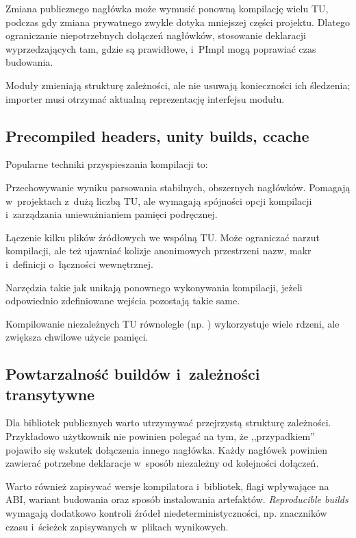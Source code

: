 Zmiana publicznego nagłówka może wymusić ponowną kompilację wielu TU,
podczas gdy zmiana prywatnego  zwykle dotyka mniejszej
części projektu. Dlatego ograniczanie niepotrzebnych dołączeń
nagłówków, stosowanie deklaracji wyprzedzających tam, gdzie są
prawidłowe, i~PImpl mogą poprawiać czas budowania.

Moduły zmieniają strukturę zależności, ale nie usuwają konieczności
ich śledzenia; importer musi otrzymać aktualną reprezentację
interfejsu modułu.

\subsection{Precompiled headers, unity builds, ccache}

Popularne techniki przyspieszania kompilacji to:
\begin{description}[style=nextline]
\item[Precompiled headers (PCH)]
Przechowywanie wyniku parsowania stabilnych, obszernych nagłówków.
Pomagają w~projektach z~dużą liczbą TU, ale wymagają spójności
opcji kompilacji i~zarządzania unieważnianiem pamięci podręcznej.
\item[Unity builds]
Łączenie kilku plików źródłowych we wspólną TU. Może ograniczać
narzut kompilacji, ale też ujawniać kolizje anonimowych przestrzeni
nazw, makr i~definicji o~łączności wewnętrznej.
\item[Compilation cache]
Narzędzia takie jak  unikają ponownego wykonywania
kompilacji, jeżeli odpowiednio zdefiniowane wejścia pozostają takie same.
\item[Parallel build]
Kompilowanie niezależnych TU równolegle (np. )
wykorzystuje wiele rdzeni, ale zwiększa chwilowe użycie pamięci.
\end{description}

\subsection{Powtarzalność buildów i~zależności transytywne}

Dla bibliotek publicznych warto utrzymywać przejrzystą strukturę
zależności. Przykładowo użytkownik nie powinien polegać na tym,
że  ,,przypadkiem'' pojawiło się wskutek
dołączenia innego nagłówka. Każdy nagłówek powinien zawierać
potrzebne deklaracje w~sposób niezależny od kolejności dołączeń.

Warto również zapisywać wersje kompilatora i~bibliotek, flagi
wpływające na ABI, wariant budowania oraz sposób instalowania
artefaktów. \emph{Reproducible builds} wymagają dodatkowo kontroli
źródeł niedeterministyczności, np. znaczników czasu i~ścieżek
zapisywanych w~plikach wynikowych.

